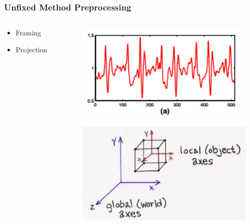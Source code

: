 \documentclass{beamer}
\begin{document}
\begin{frame}
  \frametitle{Unfixed Method Preprocessing}
  \begin{columns}
  \begin{column}{0.5\textwidth}
  	\begin{itemize}
  		\item Framing   
  		\linebreak
  		\item Projection                     
  	\end{itemize}
  \end{column}
\begin{column}{0.5\textwidth}

\includegraphics[width=0.95\textwidth]{Illustrations/Framing.png}

\includegraphics[width=0.95\textwidth]{Illustrations/global.jpg}
\end{column} 
  \end{columns}
\end{frame}
\end{document}
